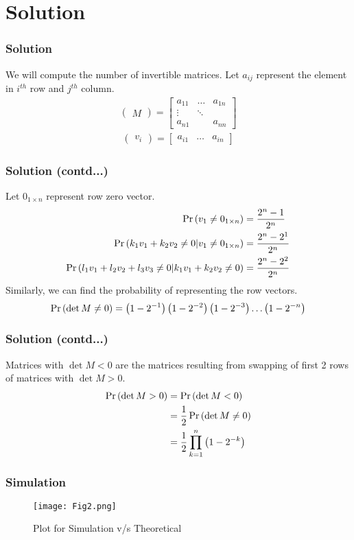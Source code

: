 \documentclass{beamer}
\newcommand{\myvec}[1]{\ensuremath{\begin{pmatrix}#1\end{pmatrix}}}
\begin{document}
\section*{Solution}
\begin{frame}[fragile]
\frametitle{Solution}
\begin{flushleft}
We will compute the number of invertible matrices. Let $a_{ij}$ represent the element in $i^{th}$ row and $j^{th}$ column.
\begin{align}
    \myvec{M}=
    \begin{bmatrix}
    a_{11} & \dots & a_{1n} \\
    \vdots & \ddots & \\
    a_{n1} &        & a_{nn}
    \end{bmatrix}
\end{align}
\begin{align}
    \myvec{v_i} =
    \begin{bmatrix}
    a_{i1} & \dots &a_{in}
    \end{bmatrix}
\end{align}
\end{flushleft}
\end{frame}
\begin{frame}[fragile]
\frametitle{Solution (contd...)}
\begin{flushleft}
Let $0_{1 \times n}$ represent row zero vector.
\begin{align}
    \Pr\left(v_1 \neq 0_{1 \times n}\right) &= \frac{2^n - 1}{2^n}\\
    \Pr\left(k_1v_1 + k_2v_2 \neq 0 | v_1 \neq 0_{1 \times n}\right) &= \frac{2^n - 2^1}{2^n}\\
    \Pr\left(l_1v_1 + l_2v_2 + l_3v_3 \neq 0 | k_1v_1 + k_2v_2 \neq 0\right) &= \frac{2^n - 2^2}{2^n}
\end{align}
Similarly, we can find the probability of representing the row vectors.
\begin{align}
    \Pr\left(\det{M} \neq 0\right) = \left(1 - 2^{-1}\right)\left(1 - 2^{-2}\right)\left(1 - 2^{-3}\right)\dots\left(1 - 2^{-n}\right)
\end{align}
\end{flushleft}
\end{frame}
\begin{frame}[fragile]
\frametitle{Solution (contd...)}
\begin{flushleft}
Matrices with $\det M < 0$ are the matrices resulting from swapping of first 2 rows of matrices with $\det M > 0$.
\begin{align}
    \Pr\left(\det{M} > 0\right) &= \Pr\left(\det{M} < 0\right)\\
    &= \frac{1}{2}\Pr\left(\det{M} \neq 0\right)\\
    &= \frac{1}{2}\prod_{k=1}^{n}\left(1 - 2^{-k}\right)
\end{align}
\end{flushleft}
\end{frame}
\begin{frame}[fragile]
\frametitle{Simulation}
\begin{flushleft}
\begin{figure}[h]
    \centering
    \texttt{[image: Fig2.png]}
    \caption{Plot for Simulation v/s Theoretical}
    \label{fig:plot}
\end{figure}
\end{flushleft}
\end{frame}
\end{document}
